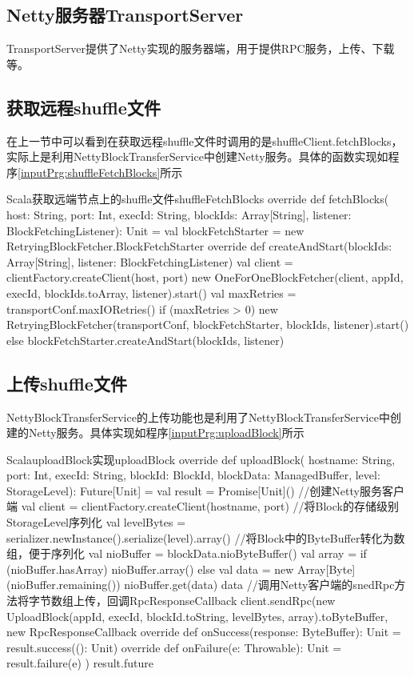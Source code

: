 \subsection{Netty服务器TransportServer}
TransportServer提供了Netty实现的服务器端，用于提供RPC服务，上传、下载等。
\subsection{获取远程shuffle文件}
在上一节中可以看到在获取远程shuffle文件时调用的是shuffleClient.fetchBlocks，实际上是利用NettyBlockTransferService中创建Netty服务。具体的函数实现如程序\ref{inputPrg:shuffleFetchBlocks}所示
\begin{codeInput}{Scala}{获取远端节点上的shuffle文件}{shuffleFetchBlocks}
override def fetchBlocks(
host: String,
port: Int,
execId: String,
blockIds: Array[String],
listener: BlockFetchingListener): Unit = {
    val blockFetchStarter = new RetryingBlockFetcher.BlockFetchStarter {
      override def createAndStart(blockIds: Array[String], listener: BlockFetchingListener) {
        val client = clientFactory.createClient(host, port)
        new OneForOneBlockFetcher(client, appId, execId, blockIds.toArray, listener).start()
      }
    }
    val maxRetries = transportConf.maxIORetries()
    if (maxRetries > 0) {
      new RetryingBlockFetcher(transportConf, blockFetchStarter, blockIds, listener).start()
    } else {
      blockFetchStarter.createAndStart(blockIds, listener)
    }
}
\end{codeInput}
\subsection{上传shuffle文件}
NettyBlockTransferService的上传功能也是利用了NettyBlockTransferService中创建的Netty服务。具体实现如程序\ref{inputPrg:uploadBlock}所示
\begin{codeInput}{Scala}{uploadBlock实现}{uploadBlock}
override def uploadBlock(
hostname: String,
port: Int,
execId: String,
blockId: BlockId,
blockData: ManagedBuffer,
level: StorageLevel): Future[Unit] = {
  val result = Promise[Unit]()
  //创建Netty服务客户端
  val client = clientFactory.createClient(hostname, port)	
  //将Block的存储级别StorageLevel序列化
  val levelBytes = serializer.newInstance().serialize(level).array()
  //将Block中的ByteBuffer转化为数组，便于序列化	
  val nioBuffer = blockData.nioByteBuffer()	
  val array = if (nioBuffer.hasArray) {
    nioBuffer.array()
  } else {
    val data = new Array[Byte](nioBuffer.remaining())
    nioBuffer.get(data)
    data
  }
  //调用Netty客户端的snedRpc方法将字节数组上传，回调RpcResponseCallback
  client.sendRpc(new UploadBlock(appId, execId, blockId.toString, levelBytes, array).toByteBuffer,
    new RpcResponseCallback {
      override def onSuccess(response: ByteBuffer): Unit = {
        result.success((): Unit)
      }
      override def onFailure(e: Throwable): Unit = {
        result.failure(e)
      }
  })
  result.future
}
\end{codeInput}
